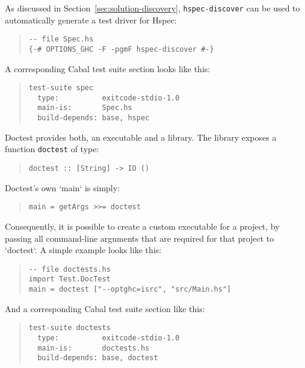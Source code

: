 \documentclass[preprint]{sigplanconf}
\begin{document}
As discussed in Section~\ref{sec:solution-discovery},
{\tt hspec-discover} can be used to automatically generate a test
driver for Hspec:

\begin{quote}
\small
\begin{verbatim}
-- file Spec.hs
{-# OPTIONS_GHC -F -pgmF hspec-discover #-}
\end{verbatim}
\end{quote}

\noindent A corresponding Cabal test suite section looks like this:

\begin{quote}
\small
\begin{verbatim}
test-suite spec
  type:          exitcode-stdio-1.0
  main-is:       Spec.hs
  build-depends: base, hspec
\end{verbatim}
\end{quote}

\noindent Doctest provides both, an executable and a library.  The library
exposes a function \verb|doctest| of type:


\begin{quote}
\small
\begin{verbatim}
doctest :: [String] -> IO ()
\end{verbatim}
\end{quote}

\noindent Doctest's own `main` is simply:
\begin{quote}
\small
\begin{verbatim}
main = getArgs >>= doctest
\end{verbatim}
\end{quote}



\noindent Consequently, it is possible to create a custom executable
for a project, by passing all command-line arguments that are required
for that project to `doctest`.  A simple example looks like this:

\begin{quote}
\small
\begin{verbatim}
-- file doctests.hs
import Test.DocTest
main = doctest ["--optghc=isrc", "src/Main.hs"]
\end{verbatim}
\end{quote}

\noindent And a corresponding Cabal test suite section like this:

\begin{quote}
\small
\begin{verbatim}
test-suite doctests
  type:          exitcode-stdio-1.0
  main-is:       doctests.hs
  build-depends: base, doctest
\end{verbatim}
\end{quote}
\end{document}
